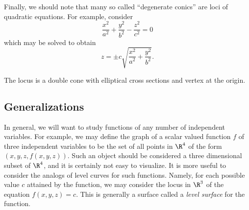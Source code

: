 \begin{center}
\end{center}

Finally, we should note that many so called ``degenerate conics''
are loci of quadratic equations.   For example, consider
\[
    \frac{x^2}{a^2} + \frac{y^2}{b^2} - \frac{z^2}{c^2} = 0
\]
which may be solved to obtain
\[
   z = \pm c\sqrt{\frac{x^2}{a^2} + \frac{y^2}{b^2}}. 
\]

The locus is a double cone with elliptical cross sections and
vertex at the origin.  

\subsection{Generalizations}
In general, we will want to study functions of any number of independent
variables.   For example, we may define the graph of a scalar valued
function $f$ of three independent variables to be the set of all points
in $\R^4$ of the form $(x,y,z,f(x,y,z))$.   Such an object
should be considered a three dimensional subset of $\R^4$, and it is
certainly not easy to visualize.  It is more useful to consider the
analogs of level curves for such functions.  Namely, for each
possible value $c$ attained by the function, we may consider the
locus in $\R^3$ of the equation $f(x,y,z) = c$.  This is generally
a surface called a \emph{level surface} for the function. 

